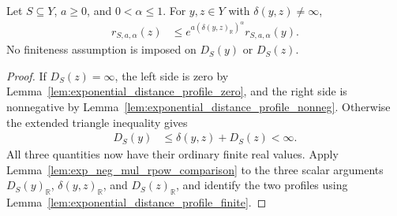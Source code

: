 \begin{lemma}
    \label{lem:exponential_distance_profile_transfer}
    \leanok
    Let $S\subseteq Y$, $a\geq0$, and $0<\alpha\leq1$.
    For $y,z\in Y$ with $\delta(y,z)\ne\infty$,
    \begin{align}
        r_{S,a,\alpha}(z) & \leq
        e^{a(\delta(y,z)_{\mathbb R})^\alpha}r_{S,a,\alpha}(y).
        \label{eq:exponential_distance_profile_transfer}
    \end{align}
    No finiteness assumption is imposed on $D_S(y)$ or $D_S(z)$.
\end{lemma}
\begin{proof}
    \leanok
    If $D_S(z)=\infty$, the left side is zero by
    Lemma~\ref{lem:exponential_distance_profile_zero}, and the right side
    is nonnegative by Lemma~\ref{lem:exponential_distance_profile_nonneg}.
    Otherwise the extended triangle inequality gives
    \begin{align}
        D_S(y) & \leq\delta(y,z)+D_S(z)<\infty.
        \label{eq:exponential_distance_profile_triangle}
    \end{align}
    All three quantities now have their ordinary finite real values.
    Apply Lemma~\ref{lem:exp_neg_mul_rpow_comparison} to the three scalar
    arguments $D_S(y)_{\mathbb R}$, $\delta(y,z)_{\mathbb R}$, and
    $D_S(z)_{\mathbb R}$, and identify the two profiles using
    Lemma~\ref{lem:exponential_distance_profile_finite}.
\end{proof}

